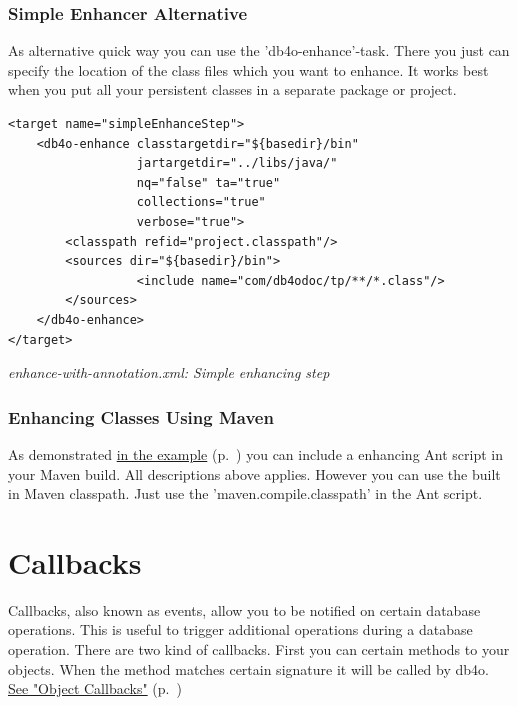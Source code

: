 \subsubsection*{Simple Enhancer Alternative}

As alternative quick way you can use the 'db4o-enhance'-task. There you just can specify the location of the class files which you want to enhance. It works best when you put all your persistent classes in a separate package or project.

\begin{lstlisting}
<target name="simpleEnhanceStep">
    <db4o-enhance classtargetdir="${basedir}/bin"
                  jartargetdir="../libs/java/"
                  nq="false" ta="true"
                  collections="true"
                  verbose="true">
        <classpath refid="project.classpath"/>
        <sources dir="${basedir}/bin">
                  <include name="com/db4odoc/tp/**/*.class"/>
        </sources>
    </db4o-enhance>
</target>
\end{lstlisting}

{\small\itshape enhance-with-annotation.xml: Simple enhancing step\par}
\medskip

\subsubsection*{Enhancing Classes Using Maven}

As demonstrated \hyperref[ref:basics-transparentpersistence-ta-enhanced-example]{in the example} (p.~\pageref{ref:basics-transparentpersistence-ta-enhanced-example}) you can include a enhancing Ant script in your Maven build. All descriptions above applies. However you can use the built in Maven classpath. Just use the 'maven.compile.classpath' in the Ant script.

\section{Callbacks}
\label{ref:advanced-topics-callbacks}

Callbacks, also known as events, allow you to be notified on certain database operations. This is useful to trigger additional operations during a database operation. There are two kind of callbacks. First you can certain methods to your objects. When the method matches certain signature it will be called by db4o. \hyperref[ref:advanced-topics-callbacks-object-callbacks]{See "Object Callbacks"} (p.~\pageref{ref:advanced-topics-callbacks-object-callbacks})

